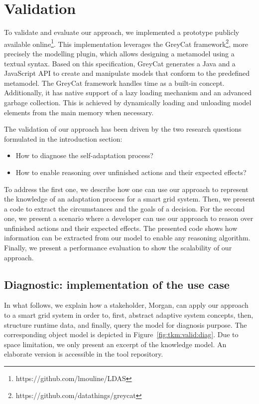 \section{Validation}
\label{sec:tkm:validation}

To validate and evaluate our approach, we implemented a prototype publicly available online\footnote{https://github.com/lmouline/LDAS}.
This implementation leverages the GreyCat framework\footnote{https://github.com/datathings/greycat}, more precisely the modelling plugin, which allows designing a \gls{metamodel} using a textual syntax.
Based on this specification, GreyCat generates a Java and a JavaScript API to create and manipulate models that conform to the predefined metamodel.
The GreyCat framework handles time as a built-in concept.
Additionally, it has native support of a lazy loading mechanism and an advanced garbage collection.
This is achieved by dynamically loading and unloading model elements from the main memory when necessary.

The validation of our approach has been driven by the two research questions formulated in the introduction section:
\begin{itemize}
    \item How to diagnose the self-adaptation process?
    \item How to enable reasoning over unfinished actions and their expected effects?
\end{itemize}

To address the first one, we describe how one can use our approach to represent the knowledge of an adaptation process for a smart grid system.
Then, we present a code to extract the circumstances and the goals of a decision.
For the second one, we present a scenario where a developer can use our approach to reason over unfinished actions and their expected effects.
The presented code shows how information can be extracted from our model to enable any reasoning algorithm.
Finally, we present a performance evaluation to show the scalability of our approach.

\subsection{Diagnostic: implementation of the use case}
In what follows, we explain how a stakeholder, Morgan, can apply our approach to a smart grid system in order to, first, abstract adaptive system concepts, then, structure runtime data, and finally, query the model for diagnosis purpose.
The corresponding object model is depicted in Figure~\ref{fig:tkm:valid:diag}.
Due to space limitation, we only present an excerpt of the knowledge model.
An elaborate version is accessible in the tool repository.

